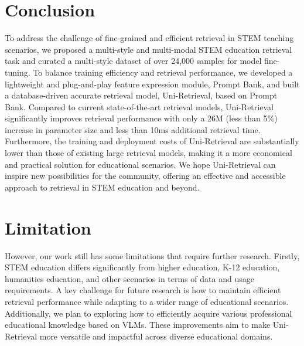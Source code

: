 \section{Conclusion}
To address the challenge of fine-grained and efficient retrieval in STEM teaching scenarios, we proposed a multi-style and multi-modal STEM education retrieval task and curated a multi-style dataset of over 24,000 samples for model fine-tuning.
To balance training efficiency and retrieval performance, we developed a lightweight and plug-and-play feature expression module, Prompt Bank, and built a database-driven accurate retrieval model, Uni-Retrieval, based on Prompt Bank.
Compared to current state-of-the-art retrieval models, Uni-Retrieval significantly improves retrieval performance with only a 26M (less than 5\%) increase in parameter size and less than 10ms additional retrieval time. Furthermore, the training and deployment costs of Uni-Retrieval are substantially lower than those of existing large retrieval models, making it a more economical and practical solution for educational scenarios.
We hope Uni-Retrieval can inspire new possibilities for the community, offering an effective and accessible approach to retrieval in STEM education and beyond.

\section*{Limitation}
However, our work still has some limitations that require further research. Firstly, STEM education differs significantly from higher education, K-12 education, humanities education, and other scenarios in terms of data and usage requirements. A key challenge for future research is how to maintain efficient retrieval performance while adapting to a wider range of educational scenarios.
Additionally, we plan to exploring how to efficiently acquire various professional educational knowledge based on VLMs. These improvements aim to make Uni-Retrieval more versatile and impactful across diverse educational domains.
